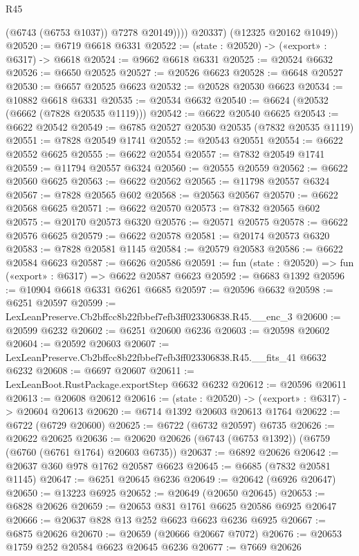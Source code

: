 \begin{lexlean}{R45}
\begin{coremodule}
{                (@6743 (@6753 @1037))
                @7278
                @20149))))
        @20337)
      (@12325 @20162 @1049))
@20520 := @6719 @6618 @6331
@20522 := (state : @20520) -> («export» : @6317) -> @6618
@20524 := @9662 @6618 @6331
@20525 := @20524 @6632
@20526 := @6650 @20525
@20527 := @20526 @6623
@20528 := @6648 @20527
@20530 := @6657 @20525 @6623
@20532 := @20528 @20530 @6623
@20534 := @10882 @6618 @6331
@20535 := @20534 @6632
@20540 := @6624 (@20532 (@6662 (@7828 @20535 @1119)))
@20542 := @6622 @20540 @6625
@20543 := @6622 @20542
@20549 := @6785 @20527 @20530 @20535 (@7832 @20535 @1119)
@20551 := @7828 @20549 @1741
@20552 := @20543 @20551
@20554 := @6622 @20552 @6625
@20555 := @6622 @20554
@20557 := @7832 @20549 @1741
@20559 := @11794 @20557 @6324
@20560 := @20555 @20559
@20562 := @6622 @20560 @6625
@20563 := @6622 @20562
@20565 := @11798 @20557 @6324
@20567 := @7828 @20565 @602
@20568 := @20563 @20567
@20570 := @6622 @20568 @6625
@20571 := @6622 @20570
@20573 := @7832 @20565 @602
@20575 := @20170 @20573 @6320
@20576 := @20571 @20575
@20578 := @6622 @20576 @6625
@20579 := @6622 @20578
@20581 := @20174 @20573 @6320
@20583 := @7828 @20581 @1145
@20584 := @20579 @20583
@20586 := @6622 @20584 @6623
@20587 := @6626 @20586
@20591 := fun (state : @20520) => fun («export» : @6317) => @6622 @20587 @6623
@20592 := @6683 @1392
@20596 := @10904 @6618 @6331 @6261 @6685
@20597 := @20596 @6632
@20598 := @6251 @20597
@20599 := LexLeanPreserve.Cb2bffcc8b22fbbef7efb3ff023306838.R45.__enc_3
@20600 := @20599 @6232
@20602 := @6251 @20600 @6236
@20603 := @20598 @20602
@20604 := @20592 @20603
@20607 := LexLeanPreserve.Cb2bffcc8b22fbbef7efb3ff023306838.R45.__fits_41 @6632 @6232
@20608 := @6697 @20607
@20611 := LexLeanBoot.RustPackage.exportStep @6632 @6232
@20612 := @20596 @20611
@20613 := @20608 @20612
@20616 := (state : @20520) -> («export» : @6317) -> @20604 @20613
@20620 := @6714 @1392 @20603 @20613 @1764
@20622 := @6722 (@6729 @20600)
@20625 := @6722 (@6732 @20597) @6735
@20626 := @20622 @20625
@20636 := @20620 @20626 (@6743 (@6753 @1392)) (@6759 (@6760 (@6761 @1764) @20603 @6735))
@20637 := @6892 @20626
@20642 := @20637 @360 @978 @1762 @20587 @6623
@20645 := @6685 (@7832 @20581 @1145)
@20647 := @6251 @20645 @6236
@20649 := @20642 (@6926 @20647)
@20650 := @13223 @6925
@20652 := @20649 (@20650 @20645)
@20653 := @6828 @20626
@20659 := @20653 @831 @1761 @6625 @20586 @6925 @20647
@20666 := @20637 @828 @13 @252 @6623 @6623 @6236 @6925
@20667 := @6875 @20626
@20670 := @20659 (@20666 @20667 @7072)
@20676 := @20653 @1759 @252 @20584 @6623 @20645 @6236
@20677 := @7669 @20626
}
\end{coremodule}
\end{lexlean}
